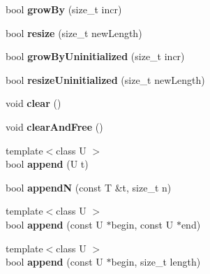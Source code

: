 \begin{DoxyCompactItemize}
\item 
\hypertarget{classjs_1_1_vector_aa15923066a81fa1a6d00d180f9720daa}{bool {\bfseries grow\-By} (size\-\_\-t incr)}\label{classjs_1_1_vector_aa15923066a81fa1a6d00d180f9720daa}

\item 
\hypertarget{classjs_1_1_vector_a1a692bd843f50988a41c519a1ff71f2b}{bool {\bfseries resize} (size\-\_\-t new\-Length)}\label{classjs_1_1_vector_a1a692bd843f50988a41c519a1ff71f2b}

\item 
\hypertarget{classjs_1_1_vector_aaafdcb0553750298b8be3998eb87c489}{bool {\bfseries grow\-By\-Uninitialized} (size\-\_\-t incr)}\label{classjs_1_1_vector_aaafdcb0553750298b8be3998eb87c489}

\item 
\hypertarget{classjs_1_1_vector_a2237d7d028758ebe5502ef13c80c1f1a}{bool {\bfseries resize\-Uninitialized} (size\-\_\-t new\-Length)}\label{classjs_1_1_vector_a2237d7d028758ebe5502ef13c80c1f1a}

\item 
\hypertarget{classjs_1_1_vector_a70b3726667abddbc51262a04bb4c7fc1}{void {\bfseries clear} ()}\label{classjs_1_1_vector_a70b3726667abddbc51262a04bb4c7fc1}

\item 
\hypertarget{classjs_1_1_vector_af27d5449e9dedff4a151ab1c12cf5ec7}{void {\bfseries clear\-And\-Free} ()}\label{classjs_1_1_vector_af27d5449e9dedff4a151ab1c12cf5ec7}

\item 
\hypertarget{classjs_1_1_vector_a1dc45f8e9014a9d93473a7b2bd4b361d}{{\footnotesize template$<$class U $>$ }\\bool {\bfseries append} (U t)}\label{classjs_1_1_vector_a1dc45f8e9014a9d93473a7b2bd4b361d}

\item 
\hypertarget{classjs_1_1_vector_a91d7e6b6c9e3b6880b5b7353ab39204c}{bool {\bfseries append\-N} (const T \&t, size\-\_\-t n)}\label{classjs_1_1_vector_a91d7e6b6c9e3b6880b5b7353ab39204c}

\item 
\hypertarget{classjs_1_1_vector_a3e14a1d0d3fb816a30f9ba95b4092e93}{{\footnotesize template$<$class U $>$ }\\bool {\bfseries append} (const U $\ast$begin, const U $\ast$end)}\label{classjs_1_1_vector_a3e14a1d0d3fb816a30f9ba95b4092e93}

\item 
\hypertarget{classjs_1_1_vector_ae8eb7dfe0e0bdbb28b3c1e9ab390aca8}{{\footnotesize template$<$class U $>$ }\\bool {\bfseries append} (const U $\ast$begin, size\-\_\-t length)}\label{classjs_1_1_vector_ae8eb7dfe0e0bdbb28b3c1e9ab390aca8}


\end{DoxyCompactItemize}

